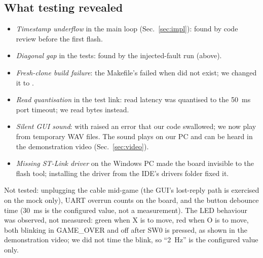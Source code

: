 \subsection{What testing revealed}
\begin{itemize}\setlength\itemsep{0pt}
\item \emph{Timestamp underflow} in the main loop (Sec.~\ref{sec:impl}): found by code review before the first flash.
\item \emph{Diagonal gap} in the tests: found by the injected-fault run (above).
\item \emph{Fresh-clone build failure}: the Makefile's  failed when  did not exist; we changed it to .
\item \emph{Read quantisation} in the test link: read latency was quantised to the 50~ms port timeout; we read  bytes instead.
\item \emph{Silent GUI sound}:  with  raised an error that our code swallowed; we now play from temporary WAV files. The sound plays on our PC and can be heard in the demonstration video (Sec.~\ref{sec:video}).
\item \emph{Missing ST-Link driver} on the Windows PC made the board invisible to the flash tool; installing the driver from the IDE's drivers folder fixed it.
\end{itemize}
Not tested: unplugging the cable mid-game (the GUI's lost-reply path is exercised on the mock only), UART overrun counts on the board, and the
button debounce time (30~ms is the configured value, not a measurement). The LED behaviour was observed, not measured: green when X is to move, red when O is to move, both blinking in GAME\_OVER and off after SW0 is pressed, as shown in the demonstration video; we did not time the blink, so ``2~Hz'' is the configured value only.

